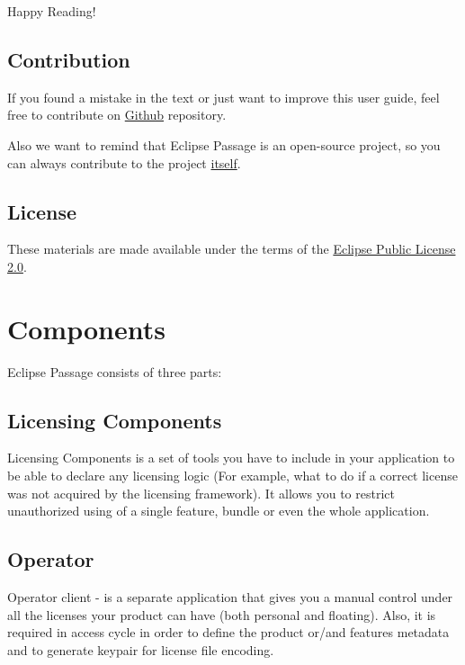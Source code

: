 \documentclass[12pt]{report}
\begin{document}
Happy Reading!

\section*{Contribution}

If you found a mistake in the text or just want to improve this user guide, feel free to contribute on \href{https://github.com/eclipse-passage/passage-docs}{Github} repository.

Also we want to remind that Eclipse Passage is an open-source project, so you can always contribute to the project \href{https://github.com/eclipse-passage/passage}{itself}.

\section*{License}

These materials are made available under the terms of the \href{https://www.eclipse.org/legal/epl-2.0/}{Eclipse Public License 2.0}.

\chapter*{Components}

Eclipse Passage consists of three parts:

\section*{Licensing Components}

Licensing Components is a set of tools you have to include in your application to be able to declare any licensing logic (For example, what to do if a correct license was not acquired by the licensing framework).
It allows you to restrict unauthorized using of a single feature, bundle or even the whole application.

\section*{Operator}

Operator client - is a separate application that gives you a manual control under all the licenses your product can have (both personal and floating). Also, it is required
in access cycle in order to define the product or/and features metadata and to generate keypair for license file encoding.
\end{document}
